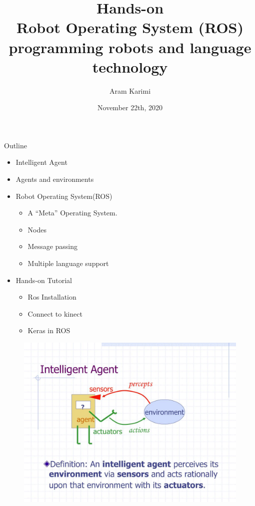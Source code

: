 \documentclass{beamer}
\title{Hands-on
	\\ Robot Operating System (ROS)
	\\ programming robots and language technology}
\author{Aram Karimi}
\institute{LT2318 H21 Artificial Intelligence: Cognitive Systems}
\date{November 22th, 2020}
\begin{document}
	\frame{\titlepage}
	\begin{frame}
	Outline
		\begin{itemize}
			\item Intelligent Agent
			\item Agents and environments
			\item Robot Operating System(ROS)
			\begin{itemize}
				\item A “Meta” Operating System.
				\item Nodes
				\item Message passing
				\item Multiple language support
			\end{itemize}
			\item Hands-on Tutorial
			\begin{itemize}
				\item Ros Installation
				\item Connect to kinect
				\item Keras in ROS
			\end{itemize}
		\end{itemize}
	\end{frame}

	\begin{frame}
		\begin{figure}[l]
			\includegraphics[scale=0.35]{intelligent-agent-l.jpg}
		\end{figure}
	\end{frame}
	
\end{document}
